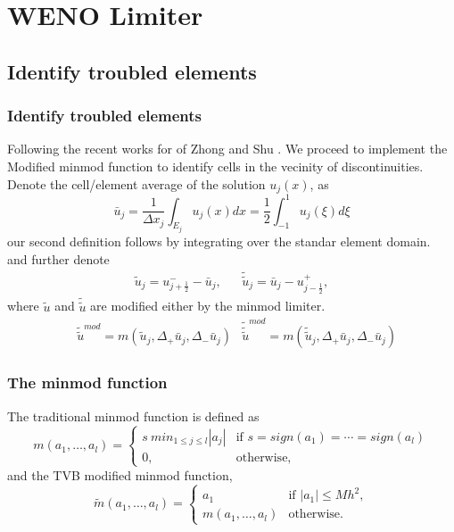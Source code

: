 \section{WENO Limiter}
\subsection{Identify troubled elements}
\begin{frame} \frametitle{Identify troubled elements}
	Following the recent works for of Zhong and Shu \cite{Zhong&Shu2012,DuShu&Zhang2013}. We proceed to implement the Modified minmod function to identify cells in the vecinity of discontinuities.
	Denote the cell/element average of the solution $u_j(x)$, as
	\begin{equation}
	\bar{u}_j = \frac{1}{\Delta x_j}\int_{E_j} u_j(x)dx = \frac{1}{2}\int_{-1}^{1} u_j(\xi)d\xi
	\label{eq:cell_average}
	\end{equation}
	our second definition follows by integrating over the standar element domain.\\
	
	and further denote 
	\begin{align}
	&\tilde{u}_j = u_{j+\frac{1}{2}}^{-}-\bar{u}_j, & 
	&\tilde{\tilde{u}}_j = \bar{u}_j-u_{j-\frac{1}{2}}^{+}, &
	\end{align}
	where $\tilde{u}$ and $\tilde{\tilde{u}}$ are modified either by the minmod limiter.
	\begin{align}
	&\tilde{\tilde{u}}^{mod} = m(\tilde{u}_j,\Delta_{+}\bar{u}_j,\Delta_{-}\bar{u}_j)
	&\tilde{\tilde{\tilde{u}}}^{mod} = m(\tilde{\tilde{u}}_j,\Delta_{+}\bar{u}_j,\Delta_{-}\bar{u}_j)
	\end{align}
\end{frame}
 
\begin{frame} \frametitle{The minmod function}
	The traditional minmod function is defined as
	\begin{equation}
	m(a_1,\dots,a_l) = 
		\begin{cases}
			s\ min_{1\leqslant j \leqslant l }|a_j| &\text{if }s=sign(a_1)=\cdots=sign(a_l)\\
			0, &\text{otherwise,}
		\end{cases}
	\label{eq:minmod}
	\end{equation}
	and the TVB modified minmod function,
	\begin{equation}
	\tilde{m}(a_1,\dots,a_l) =
		\begin{cases}
			a_1 &\text{if } |a_1|\leqslant Mh^2,\\
			m(a_1,\dots,a_l) &\text{otherwise.}
		\end{cases}
	\label{eq:MODminmod}
	\end{equation}
\end{frame}

